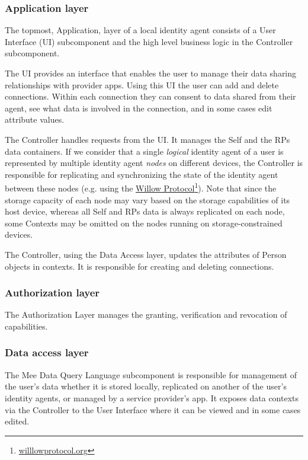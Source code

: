 \documentclass[11pt, oneside]{article}   	%
\newcommand{\hyperfootnote}[1][]{\def\ArgI{{#1}}\hyperfootnoteRelay}
\newcommand\hyperfootnoteRelay[2][]{\href{#1#2}{\ArgI}\footnote{\href{#1#2}{#2}}}
\begin{document}
\subsubsection{Application layer}

The topmost, Application, layer of a local identity agent consists of a User Interface (UI) subcomponent and the high level business logic in the Controller subcomponent. 

The UI provides an interface that enables the user to manage their data sharing relationships with provider apps. Using this UI the user can add and delete connections. Within each connection they can consent to data shared from their agent, see what data is involved in the connection, and in some cases edit attribute values. 

The Controller handles requests from the UI. It manages the Self and the RPs data containers. If we consider that a single \emph{logical} identity agent of a user is represented by multiple identity agent \emph{nodes} on different devices, the Controller is responsible for replicating and synchronizing the state of the identity agent between these nodes (e.g. using the \hyperfootnote[Willow Protocol][https://]{willlowprotocol.org}). Note that since the storage capacity of each node may vary based on the storage capabilities of its host device, whereas all Self and RPs data is always replicated on each node, some Contexts may be omitted on the nodes running on storage-constrained devices.

The Controller, using the Data Access layer, updates the attributes of Person objects in contexts. It is responsible for creating and deleting connections.

\subsubsection{Authorization layer}

The Authorization Layer manages the granting, verification and revocation of capabilities. 

\subsubsection{Data access layer}

The Mee Data Query Language subcomponent is responsible for management of the user’s data whether it is stored locally, replicated on another of the user's identity agents, or managed by a service provider's app. It exposes data contexts via the Controller to the User Interface where it can be viewed and in some cases edited. 
\end{document}
